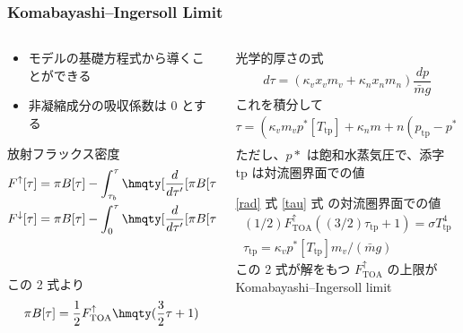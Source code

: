 \documentclass[aspectratio=149]{beamer}
\newcommand{\hmTOA}{\mathrm{TOA}}
\newcommand{\hmtp}{\mathrm{tp}}
\renewcommand{\qty}{\hmqty}
\begin{document}
\begin{frame}
	\frametitle{Komabayashi--Ingersoll Limit}
	\begin{columns}[T]
		\begin{column}{.5\textwidth}
			\begin{itemize}
				\footnotesize
				\item モデルの基礎方程式から導くことができる
				\item 非凝縮成分の吸収係数は \(0\) とする
			\end{itemize}
			\begin{block}{放射フラックス密度}
				\tiny
				\begin{gather}
					F^\uparrow[\tau]=
					\pi B[\tau]-\int^\tau_{\tau_b}\qty[\dv{}{\tau'}[\pi B[\tau']]
					\exp\left[-\frac{3}{2}(\tau'-\tau)\right]]d\tau'
					\\
					\begin{split}
						F^\downarrow[\tau]=
						\pi B[\tau]-\int^\tau_0\qty[\dv{}{\tau'}[\pi B[\tau']]
						\exp\left[-\frac{3}{2}(\tau-\tau')\right]]d\tau'\\
						-\pi B[0]\exp\left[-\frac{3}{2}\tau\right]
					\end{split}
				\end{gather}
				この 2 式より
				\begin{equation}
					\pi B[\tau]=\frac{1}{2}F^\uparrow_\hmTOA\qty(\frac{3}{2}\tau+1)
					\label{rad}
				\end{equation}
			\end{block}
		\end{column}
		\begin{column}{.5\textwidth}
			\begin{block}{光学的厚さの式}
				\tiny
				\begin{equation}
					d\tau=(\kappa_vx_vm_v+\kappa_nx_nm_n)\frac{dp}{\bar mg}
				\end{equation}
				これを積分して
				\begin{equation}
					\tau=(\kappa_vm_vp^*[T_\hmtp]+\kappa_nm+n(p_\hmtp-p^*[T_\hmtp]))
					\frac{p}{p_\hmtp}\frac{1}{\bar mg}\label{tau}
				\end{equation}
				ただし、\(p*\) は飽和水蒸気圧で、添字 \(\hmtp\) は対流圏界面での値
			\end{block}
			\begin{block}{\eqref{rad} 式 \eqref{tau} 式 の対流圏界面での値}
				\tiny
				\begin{gather}
					(1/2)F^\uparrow_\hmTOA((3/2)\tau_\hmtp+1)=\sigma T^4_\hmtp\label{radtp}\\
					\tau_\hmtp=\kappa_vp^*[T_\hmtp]m_v/(\bar mg)\label{tautp}
				\end{gather}
				この 2 式が解をもつ \(F^\uparrow_\hmTOA\) の上限が Komabayashi--Ingersoll limit
			\end{block}
		\end{column}
	\end{columns}
\end{frame}
\end{document}
